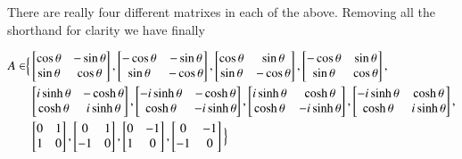 There are really four different matrixes in each of the above.  Removing all the shorthand for clarity we have finally

\begin{align*}
A \in \Bigr\{
&\begin{bmatrix}
\cos\theta & - \sin\theta \\
\sin\theta & \cos\theta \\
\end{bmatrix}, 
\begin{bmatrix}
-\cos\theta & - \sin\theta \\
\sin\theta & -\cos\theta \\
\end{bmatrix}, 
\begin{bmatrix}
\cos\theta & \sin\theta \\
\sin\theta & - \cos\theta \\
\end{bmatrix}, 
\begin{bmatrix}
-\cos\theta & \sin\theta \\
\sin\theta & \cos\theta \\
\end{bmatrix}, \\
& 
\begin{bmatrix}
i \sinh\theta & -\cosh\theta \\
\cosh\theta  & i \sinh\theta \\
\end{bmatrix}, 
\begin{bmatrix}
-i \sinh\theta & -\cosh\theta \\
\cosh\theta  & -i \sinh\theta \\
\end{bmatrix}, 
\begin{bmatrix}
i \sinh\theta & \cosh\theta \\
\cosh\theta  & - i \sinh\theta \\
\end{bmatrix}, 
\begin{bmatrix}
-i \sinh\theta & \cosh\theta \\
\cosh\theta  & i \sinh\theta \\
\end{bmatrix}, 
\\
&
\begin{bmatrix}
0 & 1 \\
1 & 0 \\
\end{bmatrix},
\begin{bmatrix}
0 & 1 \\
-1 & 0 \\
\end{bmatrix},
\begin{bmatrix}
0 & -1 \\
1 & 0 \\
\end{bmatrix},
\begin{bmatrix}
0 & -1 \\
-1 & 0 \\
\end{bmatrix}
\Bigl\}
\end{align*}

